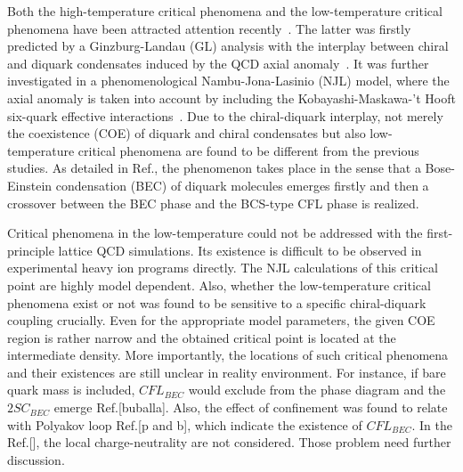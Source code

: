 \documentclass[prd, showpacs,nofootinbib,amsmath,amssymb]{revtex4}
\begin{document}
Both the high-temperature critical phenomena and the low-temperature critical phenomena have been attracted attention recently~\cite{}.
The latter was firstly predicted by a Ginzburg-Landau (GL) analysis with the interplay between chiral and diquark condensates induced by the QCD axial anomaly~\cite{}.
It was further investigated in a phenomenological Nambu-Jona-Lasinio (NJL) model, where the axial anomaly is taken into account by including the Kobayashi-Maskawa-'t Hooft six-quark effective interactions~\cite{}.
Due to the chiral-diquark interplay,
not merely the coexistence (COE) of diquark and chiral condensates but also low-temperature critical phenomena are found to be different from the previous studies.
As detailed in Ref.\cite{}, the phenomenon takes place in the sense that a Bose-Einstein condensation (BEC) of diquark molecules emerges firstly and then a crossover between the BEC phase and the BCS-type CFL phase is realized.

Critical phenomena in the low-temperature could not be addressed with the first-principle lattice QCD simulations.
Its existence is difficult to be observed in experimental heavy ion programs directly.
The NJL calculations of this critical point are highly model dependent.
Also, whether the low-temperature critical phenomena exist or not was found to be sensitive to a specific chiral-diquark coupling crucially\cite{}. Even for the appropriate model parameters, the given COE region is rather narrow and the obtained critical point is located at the intermediate density\cite{}.
More importantly, the locations of such critical phenomena and their existences are still unclear in reality environment.
For instance, if bare quark mass is included, $CFL_{BEC}$ would exclude from the phase diagram and the $2SC_{BEC}$ emerge Ref.[buballa].
Also, the effect of confinement was found to relate with Polyakov loop Ref.[p and b], which indicate the existence of $CFL_{BEC}$.
In the Ref.[], the local charge-neutrality are not considered.
Those problem need further discussion.
\end{document}
